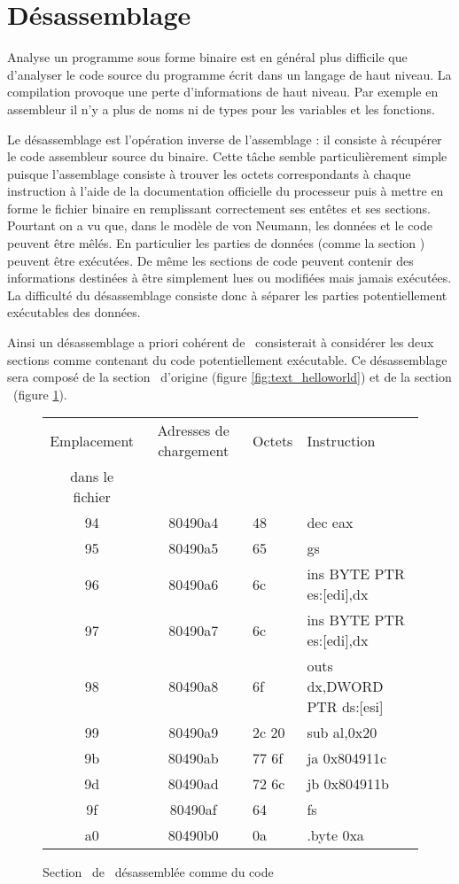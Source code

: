 \section{Désassemblage}
Analyse un programme sous forme binaire est en général plus difficile que d'analyser le code source du programme écrit dans un langage de haut niveau.
La compilation provoque une perte d'informations de haut niveau.
Par exemple en assembleur il n'y a plus de noms ni de types pour les variables et les fonctions. 

Le désassemblage est l'opération inverse de l'assemblage : il consiste à récupérer le code assembleur source du binaire.
Cette tâche semble particulièrement simple puisque l'assemblage consiste à trouver les octets correspondants à chaque instruction à l'aide de la documentation officielle du processeur puis à mettre en forme le fichier binaire en remplissant correctement ses entêtes et ses sections.
Pourtant on a vu que, dans le modèle de von Neumann, les données et le code peuvent être mêlés. 
En particulier les parties de données (comme la section \pdata) peuvent être exécutées. 
De même les sections de code peuvent contenir des informations destinées à être simplement lues ou modifiées mais jamais exécutées.
La difficulté du désassemblage consiste donc à séparer les parties potentiellement exécutables des données.

Ainsi un désassemblage a priori cohérent de \helloworld\ consisterait à considérer les deux sections comme contenant du code potentiellement exécutable. Ce désassemblage sera composé de la section \ptext\ d'origine (figure \ref{fig:text_helloworld}) et de la section \pdata\ (figure \ref{fig:data_exec_helloworld}).

\begin{figure}[h]
\begin{center}
\begin{tabular}{|c|c|l|l|}
\hline
Emplacement & Adresses de chargement & Octets & Instruction\\ 
dans le fichier & &  & \\ 
\hline
94 & 80490a4 & 48    & dec    eax			\\
95 & 80490a5 & 65    & gs				\\
96 & 80490a6 & 6c    & ins    BYTE PTR es:[edi],dx	\\
97 & 80490a7 & 6c    & ins    BYTE PTR es:[edi],dx	\\
98 & 80490a8 & 6f    & outs   dx,DWORD PTR ds:[esi]	\\
99 & 80490a9 & 2c 20 & sub    al,0x20			\\
9b & 80490ab & 77 6f & ja     0x804911c			\\
9d & 80490ad & 72 6c & jb     0x804911b			\\
9f & 80490af & 64    & fs				\\
a0 & 80490b0 & 0a    & .byte 0xa			\\
\hline
\end{tabular}
\end{center}
\caption{Section \pdata\ de \helloworld\ désassemblée comme du code}
\label{fig:data_exec_helloworld}
\end{figure}

